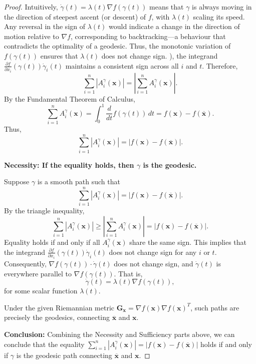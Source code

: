 \begin{proof}
{		Intuitively, $\dot{\gamma}(t)=\lambda(t)\nabla f(\gamma(t))$ means that $\gamma$ is always moving in the direction of steepest ascent (or descent) of $f$, with $\lambda(t)$ scaling its speed. Any reversal in the sign of $\lambda(t)$ would indicate a change in the direction of motion relative to $\nabla f$, corresponding to backtracking—a behaviour that contradicts the optimality of a geodesic. Thus, the monotonic variation of $f(\gamma(t))$ ensures that $\lambda(t)$ does not change sign.
		}), the integrand \( \frac{\partial f}{\partial x_i}(\gamma(t)) \dot{\gamma}_i(t) \) maintains a consistent sign across all \( i \) and \( t \). Therefore,
	\[
	\sum_{i=1}^n \left| A_i^{\gamma}(\mathbf{x}) \right| = \left| \sum_{i=1}^n A_i^{\gamma}(\mathbf{x}) \right|.
	\]
	By the Fundamental Theorem of Calculus,
	\[
	\sum_{i=1}^n A_i^{\gamma}(\mathbf{x}) = \int_0^1 \frac{d}{dt} f(\gamma(t)) \, dt = f(\mathbf{x}) - f(\overline{\mathbf{x}}).
	\]
	Thus,
	\[
	\sum_{i=1}^n \left| A_i^{\gamma}(\mathbf{x}) \right| = \left| f(\mathbf{x}) - f(\overline{\mathbf{x}}) \right|.
	\]

	\noindent
	\textbf{Necessity: If the equality holds, then \( \gamma \) is the geodesic.}
	
	Suppose \( \gamma \) is a smooth path such that
	\[
	\sum_{i=1}^n \left| A_i^{\gamma}(\mathbf{x}) \right| = \left| f(\mathbf{x}) - f(\overline{\mathbf{x}}) \right|.
	\]
	By the triangle inequality,
	\[
	\sum_{i=1}^n \left| A_i^{\gamma}(\mathbf{x}) \right| \geq \left| \sum_{i=1}^n A_i^{\gamma}(\mathbf{x}) \right| = \left| f(\mathbf{x}) - f(\overline{\mathbf{x}}) \right|.
	\]
	Equality holds if and only if all \( A_i^{\gamma}(\mathbf{x}) \) share the same sign. This implies that the integrand \( \frac{\partial f}{\partial x_i}(\gamma(t)) \dot{\gamma}_i(t) \) does not change sign for any \( i \) or \( t \). Consequently, \( \nabla f(\gamma(t)) \cdot \dot{\gamma}(t) \) does not change sign, and \( \dot{\gamma}(t) \) is everywhere parallel to \( \nabla f(\gamma(t)) \). That is,
	\[
	\dot{\gamma}(t) = \lambda(t) \nabla f(\gamma(t)),
	\]
	for some scalar function \( \lambda(t) \).
	
	Under the given Riemannian metric \( \mathbf{G}_{\mathbf{x}} = \nabla f(\mathbf{x}) \nabla f(\mathbf{x})^T \), such paths are precisely the geodesics, connecting \( \overline{\mathbf{x}} \) and \( \mathbf{x} \).
	
	\noindent
	\textbf{Conclusion:} Combining the Necessity and Sufficiency parts above, we can conclude that 
	the equality \( \sum_{i=1}^n \left| A_i^{\gamma}(\mathbf{x}) \right| = \left| f(\mathbf{x}) - f(\overline{\mathbf{x}}) \right| \) holds if and only if \( \gamma \) is the geodesic path connecting \( \overline{\mathbf{x}} \) and \( \mathbf{x} \). 
\end{proof}
\newpage


